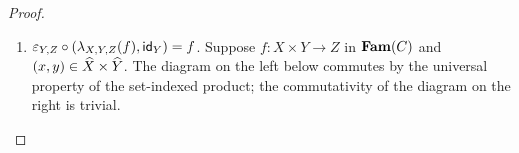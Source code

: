 \begin{proof}
\begin{enumerate}
To show $\lambda_{X,Y,Z}(f^\dagger, g^\dagger) = (f,g)$, suppose $\lambda_{X,Y,Z}(f^\dagger, g^\dagger) = (f',
g')$. Then:
\begin{itemize}
\item $f'(x) = (f^\dagger \comp (x, -), \reindex{g^\dagger}{(x,-)} \comp \biinj_{\faml{Y}}): Y \to Z$ where
$\biinj_{\faml{Y}}: \faml{Y} \to \const_{\idx{Y}}(\faml{X}_x) \biprod \faml{Y}$
\item $g'_x = \lambda_{\prod_{\idx{Y}}}(\reindex{g^\dagger}{(x,-)} \comp \biinj_{\faml{X}_x}:
\const_{\idx{Y}}(\faml{X}_x) \to \reindex{\faml{Z}}{f^\dagger})$ where $\biinj_{\faml{X}_x}:
\const_{\idx{Y}}(\faml{X}_x) \to \const_{\idx{Y}}(\faml{X}_x) \biprod \faml{Y}$.
\end{itemize}
\noindent To show $f' = f : \idx{X} \to \Fam(C)(Y,Z)$, suppose $x \in \idx{X}$ and show $f'(x) = f(x): Y \to
Z$. Suppose $y \in \idx{Y}$.
\begin{enumerate}
\item $\idx{f'(x)}(y) = (f^\dagger \comp (x, -))(y) = f^\dagger(x,y) = \idx{f(x)}(y)$.
\item $\faml{f'(x)}_y = (\reindex{g^\dagger}{(x,-)} \comp \biinj_{\faml{Y}})_y = \reindex{g^\dagger}{(x,-)}_y \comp
{\biinj_{\faml{Y}}}_y = g^\dagger_{x,y} \comp {\biinj_{\faml{Y}}}_y = \coprodM{{\eval_{\prod}}_y \comp
g_x}{\faml{f(x)}_y} \comp {\biinj_{\faml{Y}}}_y = \faml{f(x)}_y$.
\end{enumerate}

To show $g' = g$, suppose $x \in \idx{X}$.
\begin{align*}
\small
g'_x
&=
\lambda_{\prod_{\idx{Y}}}(\reindex{g^\dagger}{(x,-)} \comp \biinj_{\faml{X}_x}) \\
&=
\lambda_{\prod_{\idx{Y}}}(\{g^\dagger_{(x,y)} \comp (\biinj_{\faml{X}_x})_y\}_{y \in \idx{Y}}) \\
&=
\lambda_{\prod_{\idx{Y}}}(\{\coprodM{{\eval_{\prod}}_y \comp g_x}{\faml{f(x)}_y} \comp (\biinj_{\faml{X}_x})_y\}_{y \in \idx{Y}}) \\
&=
\lambda_{\prod_{\idx{Y}}}(\{{\eval_{\prod}}_y \comp g_x\}_{y \in \idx{Y}}) \\
&=
g_x
\end{align*}
\qed

\item $\varepsilon_{Y,Z} \circ (\lambda_{X,Y,Z}(f), \mathsf{id}_{Y}) = f$. Suppose $f: X \times Y \to Z$ in $\mathbf{Fam}(C)$
and $(x, y) \in \widehat{X} \times \widehat{Y}$. The diagram on the left below commutes by the universal property of
the set-indexed product; the commutativity of the diagram on the right is trivial.


\end{enumerate}
\end{proof}
